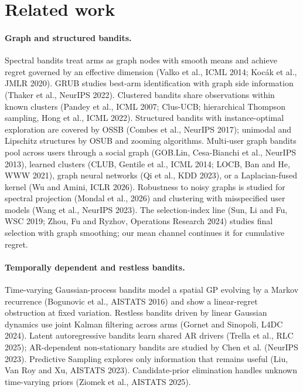 \documentclass[11pt]{article}
\theoremstyle{definition}
\theoremstyle{remark}
\begin{document}
\section{Related work}

\paragraph{Graph and structured bandits.} Spectral bandits treat arms as graph nodes with smooth means and achieve regret governed by an effective dimension (Valko et al., ICML 2014; Koc\'ak et al., JMLR 2020). GRUB studies best-arm identification with graph side information (Thaker et al., NeurIPS 2022). Clustered bandits share observations within known clusters (Pandey et al., ICML 2007; Clus-UCB; hierarchical Thompson sampling, Hong et al., ICML 2022). Structured bandits with instance-optimal exploration are covered by OSSB (Combes et al., NeurIPS 2017); unimodal and Lipschitz structures by OSUB and zooming algorithms. Multi-user graph bandits pool across users through a social graph (GOB.Lin, Cesa-Bianchi et al., NeurIPS 2013), learned clusters (CLUB, Gentile et al., ICML 2014; LOCB, Ban and He, WWW 2021), graph neural networks (Qi et al., KDD 2023), or a Laplacian-fused kernel (Wu and Amini, ICLR 2026). Robustness to noisy graphs is studied for spectral projection (Mondal et al., 2026) and clustering with misspecified user models (Wang et al., NeurIPS 2023). The selection-index line (Sun, Li and Fu, WSC 2019; Zhou, Fu and Ryzhov, Operations Research 2024) studies final selection with graph smoothing; our mean channel continues it for cumulative regret.

\paragraph{Temporally dependent and restless bandits.} Time-varying Gaussian-process bandits model a spatial GP evolving by a Markov recurrence (Bogunovic et al., AISTATS 2016) and show a linear-regret obstruction at fixed variation. Restless bandits driven by linear Gaussian dynamics use joint Kalman filtering across arms (Gornet and Sinopoli, L4DC 2024). Latent autoregressive bandits learn shared AR drivers (Trella et al., RLC 2025); AR-dependent non-stationary bandits are studied by Chen et al. (NeurIPS 2023). Predictive Sampling explores only information that remains useful (Liu, Van Roy and Xu, AISTATS 2023). Candidate-prior elimination handles unknown time-varying priors (Ziomek et al., AISTATS 2025).
\end{document}
